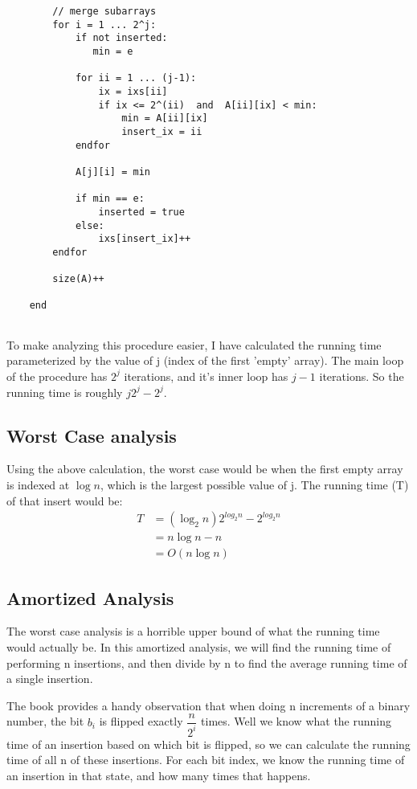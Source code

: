 \documentclass[a4paper,12pt]{article}
\begin{document}
\begin{enumerate}[a)]
\begin{verbatim}
        // merge subarrays 
        for i = 1 ... 2^j:
            if not inserted:
               min = e
           
            for ii = 1 ... (j-1):
                ix = ixs[ii] 
                if ix <= 2^(ii)  and  A[ii][ix] < min:
                    min = A[ii][ix]
                    insert_ix = ii
            endfor

            A[j][i] = min

            if min == e:
                inserted = true
            else:
                ixs[insert_ix]++
        endfor
        
        size(A)++
    
    end
        
  \end{verbatim}

  To make analyzing this procedure easier, I have calculated the running time 
  parameterized by the value of j (index of the first 'empty' array). The main 
  loop of the procedure has \(2^j\) iterations, and it's inner loop has \(j-1\) 
  iterations. So the running time is roughly \(j2^j - 2^j\).
  
  \subsection*{Worst Case analysis}

  Using the above calculation, the worst case would be when the first empty array
  is indexed at \(\log n\), which is the largest possible value of j. The running 
  time (T) of that insert would be:
  \begin{align*}
    T& = (\log_2 n)2^{log_2 n} - 2^{log_2 n}\\
    & = n\log n - n \\
    & = O(n\log n)
  \end{align*}

  \subsection*{Amortized Analysis}

  The worst case analysis is a horrible upper bound of what the running time would
  actually be. In this amortized analysis, we will find the running time of performing
  n insertions, and then divide by n to find the average running time of a single
  insertion.

  \noindent The book provides a handy observation that when doing n increments of a
  binary number, the bit \(b_i\) is flipped exactly \(\dfrac{n}{2^i} \)
  times. Well we know what the running time of an insertion based on which bit is 
  flipped, so we can calculate the running time of all n of these insertions. For
  each bit index, we know the running time of an insertion in that state, and how
  many times that happens.


\end{enumerate}
\end{document}
